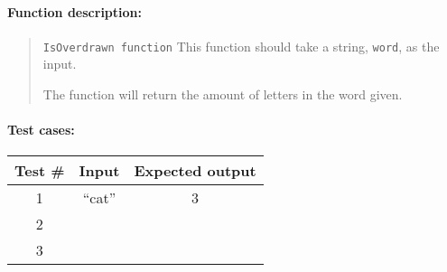 \paragraph{Function description:}

\begin{quote}
    \texttt{IsOverdrawn function}
    This function should take a string, \texttt{word}, as the input.

    The function will return the amount of letters in the word given.
\end{quote}

\paragraph{Test cases:}

\begin{center}
    \begin{tabular}{c | c | c}
        \textbf{Test \#} &
        \textbf{Input} &
        \textbf{Expected output}
        \\ \hline
        1 & ``cat'' & 3
        \\ \hline
        2 & & \\ \hline
        3 & & \\ \hline
    \end{tabular}
\end{center}


